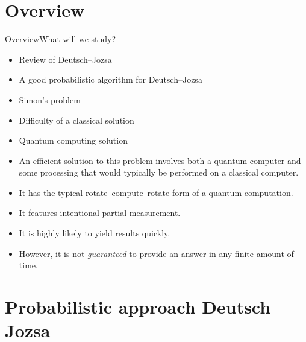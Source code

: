 
\section*{Overview}

\begin{frame}{Overview}{What will we study?}

\begin{itemize}
    \item Review of Deutsch--Jozsa
    \item A good probabilistic algorithm for Deutsch--Jozsa
    \item Simon's problem
    \item Difficulty of a classical solution
    \item Quantum computing solution
    \item An efficient solution to this problem involves both a quantum computer and some processing that would typically be performed on a classical computer.
    \item It has the typical rotate--compute--rotate form of a quantum computation.
    \item It features intentional partial measurement.
    \item It is highly likely to yield results quickly.
    \item However, it is not \emph{guaranteed} to provide an answer in any finite amount of time.
\end{itemize}

\end{frame}

\section*{Probabilistic approach Deutsch--Jozsa}

